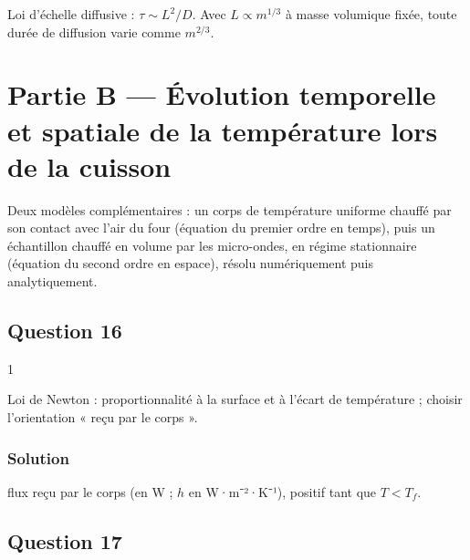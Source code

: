 \documentclass[11pt,a4paper]{article}
\newcommand{\equationajustee}[1]{%
  \sbox{\boiteequation}{$\displaystyle #1$}%
  \ifdim\wd\boiteequation>\linewidth
    \[\resizebox{\linewidth}{!}{\usebox{\boiteequation}}\]%
  \else
    \[#1\]%
  \fi}
\begin{document}
\begin{methode}

Loi d'échelle diffusive : \(\tau\sim L^2/D\). Avec \(L\propto m^{1/3}\) à masse volumique fixée, toute durée de diffusion varie comme \(m^{2/3}\).

\end{methode}

\hypertarget{partie-b-uxe9volution-temporelle-et-spatiale-de-la-tempuxe9rature-lors-de-la-cuisson}{%
\section{Partie B --- Évolution temporelle et spatiale de la température lors de la cuisson}\label{partie-b-uxe9volution-temporelle-et-spatiale-de-la-tempuxe9rature-lors-de-la-cuisson}}

Deux modèles complémentaires : un corps de température uniforme chauffé par son contact avec l'air du four (équation du premier ordre en temps), puis un échantillon chauffé en volume par les micro-ondes, en régime stationnaire (équation du second ordre en espace), résolu numériquement puis analytiquement.

\hypertarget{question-16}{%
\subsection{Question 16}\label{question-16}}

\begin{indication}{1}

Loi de Newton : proportionnalité à la surface et à l'écart de température ; choisir l'orientation « reçu par le corps ».

\end{indication}

\hypertarget{solution-15}{%
\subsubsection{Solution}\label{solution-15}}

\equationajustee{\boxed{\Phi_{cc}=hS\left(T_f-T(t)\right)}}

flux reçu par le corps (en W ; \(h\) en W·m⁻²·K⁻¹), positif tant que \(T<T_f\).

\hypertarget{question-17}{%
\subsection{Question 17}\label{question-17}}
\end{document}
